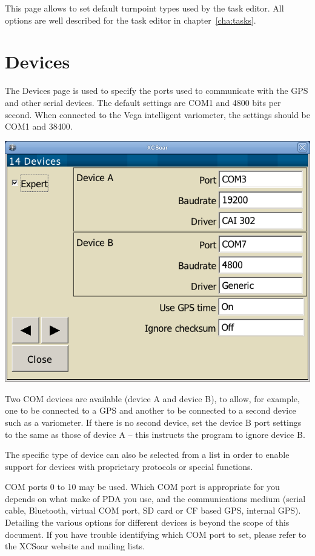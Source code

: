 This page allows to set default turnpoint types used by the task editor. All 
options are well described for the task editor in chapter~\ref{cha:tasks}.


\clearpage
\section{Devices} \label{conf:comdevices}

The Devices page is used to specify the ports used to communicate with
the GPS and other serial devices. The default settings are COM1 and
4800 bits per second.  When connected to the Vega intelligent
variometer, the settings should be COM1 and 38400.

\begin{center}
\includegraphics[angle=0,width=0.8\linewidth,keepaspectratio='true']{figures/config-devices.png}
\end{center}

Two COM devices are available (device A and device B), to allow, for
example, one to be connected to a GPS and another to be connected to a
second device such as a variometer.  If there is no second device, set
the device B port settings to the same as those of device A -- this
instructs the program to ignore device B.

The specific type of device can also be selected from a list in order
to enable support for devices with proprietary protocols or special
functions.

COM ports 0 to 10 may be used.  Which COM port is appropriate for you
depends on what make of PDA you use, and the communications medium
(serial cable, Bluetooth, virtual COM port, SD card or CF based GPS,
internal GPS).  Detailing the various options for different devices is
beyond the scope of this document.  If you have trouble identifying
which COM port to set, please refer to the XCSoar website and mailing
lists.

